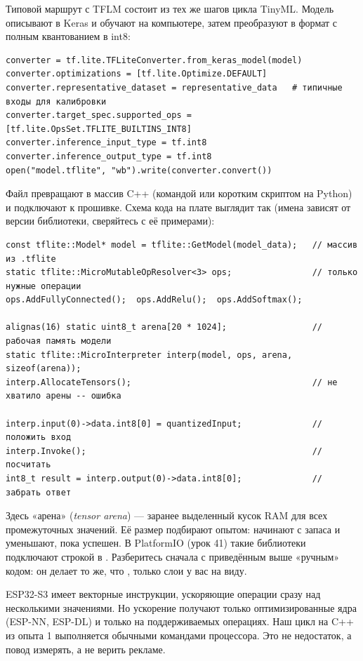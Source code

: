 Типовой маршрут с TFLM состоит из тех же шагов цикла TinyML. Модель описывают в Keras
и обучают на компьютере, затем преобразуют в формат  с полным квантованием в int8:

\begin{Verbatim}[fontsize=\footnotesize,bgcolor=codebg]
converter = tf.lite.TFLiteConverter.from_keras_model(model)
converter.optimizations = [tf.lite.Optimize.DEFAULT]
converter.representative_dataset = representative_data   # типичные входы для калибровки
converter.target_spec.supported_ops = [tf.lite.OpsSet.TFLITE_BUILTINS_INT8]
converter.inference_input_type = tf.int8
converter.inference_output_type = tf.int8
open("model.tflite", "wb").write(converter.convert())
\end{Verbatim}

Файл превращают в массив C++ (командой  или коротким скриптом на Python) и подключают
к прошивке. Схема кода на плате выглядит так (имена зависят от версии библиотеки,
сверяйтесь с её примерами):

\begin{Verbatim}[fontsize=\footnotesize,bgcolor=codebg]
const tflite::Model* model = tflite::GetModel(model_data);   // массив из .tflite
static tflite::MicroMutableOpResolver<3> ops;                // только нужные операции
ops.AddFullyConnected();  ops.AddRelu();  ops.AddSoftmax();

alignas(16) static uint8_t arena[20 * 1024];                 // рабочая память модели
static tflite::MicroInterpreter interp(model, ops, arena, sizeof(arena));
interp.AllocateTensors();                                    // не хватило арены -- ошибка

interp.input(0)->data.int8[0] = quantizedInput;              // положить вход
interp.Invoke();                                             // посчитать
int8_t result = interp.output(0)->data.int8[0];              // забрать ответ
\end{Verbatim}

Здесь «арена» (\emph{tensor arena}) --- заранее выделенный кусок RAM для всех промежуточных значений.
Её размер подбирают опытом: начинают с запаса и уменьшают, пока  успешен.
В PlatformIO (урок 41) такие библиотеки подключают строкой в . Разберитесь сначала с
приведённым выше «ручным» кодом: он делает то же, что , только слои у вас на виду.

\begin{fact}
ESP32-S3 имеет векторные инструкции, ускоряющие операции сразу над несколькими значениями. Но ускорение получают
только оптимизированные ядра (ESP-NN, ESP-DL) и только на поддерживаемых операциях. Наш цикл на C++ из
опыта 1 выполняется обычными командами процессора. Это не недостаток, а повод измерять, а не верить рекламе.
\end{fact}

